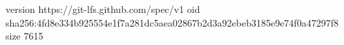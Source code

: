 version https://git-lfs.github.com/spec/v1
oid sha256:4fd8e334b925554e1f7a281dc5aea02867b2d3a92ebeb3185e9e74f0a47297f8
size 7615
